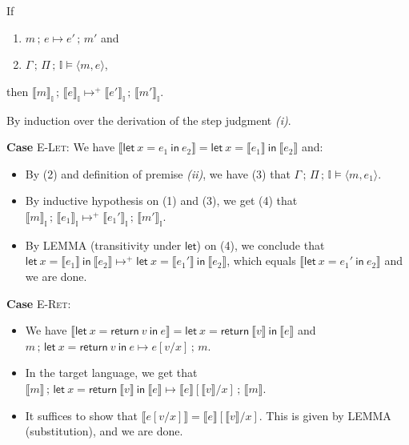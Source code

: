 \documentclass{article}
\newcommand{\mf}[1]{\mathsf{#1}}
\newcommand{\tb}[1]{\textbf{#1}}
\newcommand{\ts}[1]{\textsc{#1}}
\newcommand{\semi}{\,;\,}
\newcommand{\llrr}[1]{\llbracket #1 \rrbracket}
\newcommand{\pair}[2]{\langle #1, #2 \rangle}
\newcommand{\ptp}{A}
\newcommand{\estep}[4]{#1 \semi #2 \mapsto #3 \semi #4}
\newcommand{\I}{\mathbb{I}}
\newcommand{\elet}[3]{\mf{let}\ #1 = #2\ \mf{in}\ #3}
\newcommand{\eret}[1]{\mf{return}\ #1}
\begin{document}
\begin{theorem}
\label{thm:simexp}
If \begin{enumerate}[label=(\roman*)]
\item $m \semi e \mapsto e' \semi m'$ and
\item $\Gamma \semi \Pi \semi \I \vDash \pair{m}{e}$,
\end{enumerate}
then $\llrr{m}_\I \semi \llrr{e}_\I 
\mapsto^+ \llrr{e'}_\I \semi \llrr{m'}_\I$.

\begin{Proof}
By induction over the derivation of the step judgment \emph{(i)}.

\tb{Case} \ts{E-Let}: We have 
$\llrr{\elet{x}{e_1}{e_2}}=\elet{x}{\llrr{e_1}}{\llrr{e_2}}$
and:
\begin{itemize}
\item By (2) and definition of premise \emph{(ii)},
we have (3) that $\Gamma \semi \Pi \semi \I \vDash \pair{m}{e_1}$.
\item By inductive hypothesis on (1) and (3),
we get (4) that $\llrr{m}_\I \semi \llrr{e_1}_\I 
\mapsto^+ \llrr{e_1'}_\I \semi \llrr{m'}_\I$.
\item By LEMMA (transitivity under $\mf{let}$) on (4),
we conclude that $\elet{x}{\llrr{e_1}}{\llrr{e_2}} \mapsto^+
\elet{x}{\llrr{e_1'}}{\llrr{e_2}}$, 
which equals $\llrr{\elet{x}{e_1'}{e_2}}$
and we are done.
\end{itemize}

\tb{Case} \ts{E-Ret}: \begin{itemize}
\item We have
$\llrr{\elet{x}{\eret{v}}{e}} = \elet{x}{\eret{\llrr{v}}}{\llrr{e}}$
and $m \semi \elet{x}{\eret{v}}{e} \mapsto e[v/x] \semi m$.
\item In the target language, we get that
$\llrr{m} \semi \elet{x}{\eret{\llrr{v}}}{\llrr{e}}
\mapsto
\llrr{e}[\llrr{v}/x] \semi \llrr{m}$.
\item It suffices to show that $\llrr{e[v/x]} = \llrr{e}[\llrr{v}/x]$.
This is given by LEMMA (substitution), and we are done.
\end{itemize}


\end{Proof}
\end{theorem}
\end{document}

